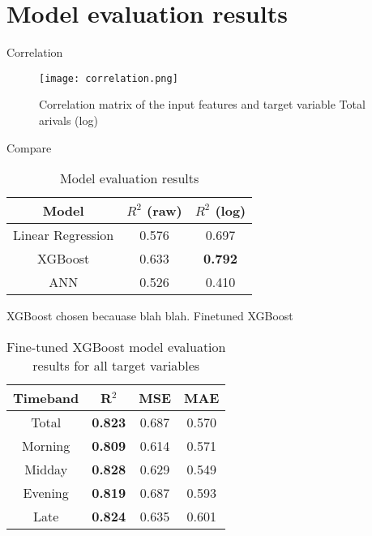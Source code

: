 \pagebreak
\section{Model evaluation results}

Correlation 

\begin{figure}[ht]
    \centering
    \texttt{[image: correlation.png]}
    \caption{Correlation matrix of the input features and target variable Total arivals (log)}
    \label{fig:corrmatt}
\end{figure}


Compare

\begin{table}[ht]
    \centering
    \renewcommand{\arraystretch}{1.5}
    \begin{tabular}{|c|c|c|}
        \hline
        \rowcolor{lightgray}
        \textbf{Model} & \textbf{$R^2$ (raw)} & \textbf{$R^2$ (log)} \\
        \hline
        Linear Regression & 0.576 & 0.697 \\
        \rowcolor{pink}
        XGBoost & 0.633 & \textbf{0.792} \\
        ANN & 0.526 & 0.410\\
        \hline
    \end{tabular}
    \caption{Model evaluation results}
    \label{tab:modeleval}
\end{table}

XGBoost chosen becauase blah blah.
Finetuned XGBoost

\begin{table}[ht]
    \centering
    \renewcommand{\arraystretch}{1.5}
    \begin{tabular}{|c|c|c|c|}
        \hline
        \rowcolor{lightgray}
        \textbf{Timeband} & \textbf{R$^2$} & \textbf{MSE} & \textbf{MAE} \\
        \hline
        Total   & \textbf{0.823} & 0.687 & 0.570 \\
        Morning & \textbf{0.809} & 0.614 & 0.571 \\
        Midday  & \textbf{0.828} & 0.629 & 0.549 \\
        Evening & \textbf{0.819} & 0.687 & 0.593 \\
        Late    & \textbf{0.824} & 0.635 & 0.601 \\
        \hline
    \end{tabular}
    \caption{Fine-tuned XGBoost model evaluation results for all target variables}
    \label{tab:modelevaltimeband}
\end{table}

